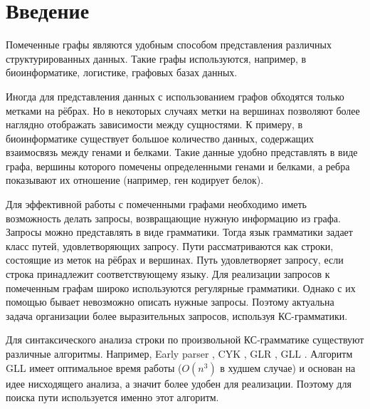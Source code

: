 \documentclass[14pt]{matmex-diploma}
\begin{document}
\maketitle
\tableofcontents
\section*{Введение}
    Помеченные графы являются удобным способом представления различных структурированных данных. Такие графы используются, например, в биоинформатике, логистике, графовых базах данных.
    
    Иногда для представления данных с использованием графов обходятся только метками на рёбрах. Но в некоторых случаях метки на вершинах позволяют более наглядно отображать зависимости между сущностями. К примеру, в биоинформатике существует большое количество данных, содержащих взаимосвязь между генами и белками. Такие данные удобно представлять в виде графа, вершины которого помечены определенными генами и белками, а ребра показывают их отношение (например, ген кодирует белок).
     
    Для эффективной работы с помеченными графами необходимо иметь возможность делать запросы, возвращающие нужную информацию из графа. Запросы можно представлять в виде грамматики. Тогда язык грамматики задает класс путей, удовлетворяющих запросу. Пути рассматриваются как строки, состоящие из меток на рёбрах и вершинах. Путь удовлетворяет запросу, если строка принадлежит соответствующему языку.  Для реализации запросов к помеченным графам широко используются регулярные грамматики. Однако с их помощью бывает невозможно описать нужные запросы. Поэтому актуальна задача организации более выразительных запросов, используя КС-грамматики.

    Для синтаксического анализа строки по произвольной КС-грамматике существуют различные алгоритмы. Например, Early parser \cite{Early} ,  CYK \cite{CYK},  GLR \cite{glr}, GLL \cite{gll}. Алгоритм GLL имеет оптимальное время работы ($O(n^3)$ в худшем случае) и основан на идее нисходящего анализа, а значит более удобен для реализации. Поэтому для поиска пути используется именно этот алгоритм.
\end{document}
